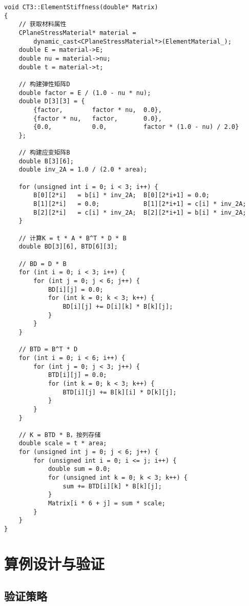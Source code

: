 \documentclass[12pt,a4paper]{article}
\begin{document}
\begin{lstlisting}[caption=单元刚度矩阵计算实现]
void CT3::ElementStiffness(double* Matrix)
{
    // 获取材料属性
    CPlaneStressMaterial* material = 
        dynamic_cast<CPlaneStressMaterial*>(ElementMaterial_);
    double E = material->E;
    double nu = material->nu;
    double t = material->t;
    
    // 构建弹性矩阵D
    double factor = E / (1.0 - nu * nu);
    double D[3][3] = {
        {factor,        factor * nu,  0.0},
        {factor * nu,   factor,       0.0},
        {0.0,           0.0,          factor * (1.0 - nu) / 2.0}
    };
    
    // 构建应变矩阵B
    double B[3][6];
    double inv_2A = 1.0 / (2.0 * area);
    
    for (unsigned int i = 0; i < 3; i++) {
        B[0][2*i]   = b[i] * inv_2A;  B[0][2*i+1] = 0.0;
        B[1][2*i]   = 0.0;            B[1][2*i+1] = c[i] * inv_2A;
        B[2][2*i]   = c[i] * inv_2A;  B[2][2*i+1] = b[i] * inv_2A;
    }
    
    // 计算K = t * A * B^T * D * B
    double BD[3][6], BTD[6][3];
    
    // BD = D * B
    for (int i = 0; i < 3; i++) {
        for (int j = 0; j < 6; j++) {
            BD[i][j] = 0.0;
            for (int k = 0; k < 3; k++) {
                BD[i][j] += D[i][k] * B[k][j];
            }
        }
    }
    
    // BTD = B^T * D
    for (int i = 0; i < 6; i++) {
        for (int j = 0; j < 3; j++) {
            BTD[i][j] = 0.0;
            for (int k = 0; k < 3; k++) {
                BTD[i][j] += B[k][i] * D[k][j];
            }
        }
    }
    
    // K = BTD * B，按列存储
    double scale = t * area;
    for (unsigned int j = 0; j < 6; j++) {
        for (unsigned int i = 0; i <= j; i++) {
            double sum = 0.0;
            for (unsigned int k = 0; k < 3; k++) {
                sum += BTD[i][k] * B[k][j];
            }
            Matrix[i * 6 + j] = sum * scale;
        }
    }
}
\end{lstlisting}

\section{算例设计与验证}

\subsection{验证策略}
\end{document}
